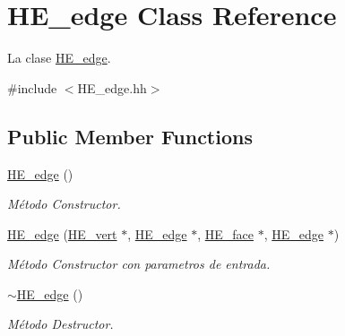 \hypertarget{class_h_e__edge}{\section{H\-E\-\_\-edge Class Reference}
\label{class_h_e__edge}
}


La clase \hyperlink{class_h_e__edge}{H\-E\-\_\-edge}.  




{\ttfamily \#include $<$H\-E\-\_\-edge.\-hh$>$}

\subsection*{Public Member Functions}
\begin{DoxyCompactItemize}
\item 
\hyperlink{class_h_e__edge_afbd057f4aae8455be8915d37a6d68abc}{H\-E\-\_\-edge} ()
\begin{DoxyCompactList}\small\item\em Método Constructor. \end{DoxyCompactList}\item 
\hyperlink{class_h_e__edge_a06abe32cf6548c2893b2be8a31a442b2}{H\-E\-\_\-edge} (\hyperlink{class_h_e__vert}{H\-E\-\_\-vert} $\ast$, \hyperlink{class_h_e__edge}{H\-E\-\_\-edge} $\ast$, \hyperlink{class_h_e__face}{H\-E\-\_\-face} $\ast$, \hyperlink{class_h_e__edge}{H\-E\-\_\-edge} $\ast$)
\begin{DoxyCompactList}\small\item\em Método Constructor con parametros de entrada. \end{DoxyCompactList}\item 
\hypertarget{class_h_e__edge_a1eeb049d48d330dccd705d95e19f72d6}{\hyperlink{class_h_e__edge_a1eeb049d48d330dccd705d95e19f72d6}{$\sim$\-H\-E\-\_\-edge} ()}\label{class_h_e__edge_a1eeb049d48d330dccd705d95e19f72d6}

\begin{DoxyCompactList}\small\item\em Método Destructor. \end{DoxyCompactList}\end{DoxyCompactItemize}
